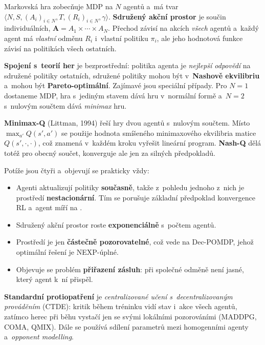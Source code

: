 \documentclass[11pt,a4paper]{article}
\theoremstyle{definition}
\begin{document}
\begin{defbox}
Markovská hra zobecňuje MDP na $N$ agentů a~má tvar
$\langle N, S, (A_i)_{i\in N}, T, (R_i)_{i \in N}, \gamma\rangle$.
\textbf{Sdružený akční prostor} je součin individuálních,
$\mathbf{A} = A_1 \times \cdots \times A_N$. Přechod závisí na akcích \emph{všech} agentů
a~každý agent má \emph{vlastní} odměnu $R_i$ i~vlastní politiku $\pi_i$, ale jeho hodnotová
funkce závisí na politikách všech ostatních.

\textbf{Spojení s~teorií her} je bezprostřední: politika agenta je \emph{nejlepší odpovědí} na
sdružené politiky ostatních, sdružené politiky mohou být v~\textbf{Nashově ekvilibriu} a~mohou
být \textbf{Pareto-optimální}. Zajímavé jsou speciální případy. Pro $N=1$ dostaneme MDP, hra
s~jediným stavem dává hru v~normální formě a~$N=2$ s~nulovým součtem dává \emph{minimax} hru.

\textbf{Minimax-Q} (Littman, 1994) řeší hry dvou agentů s~nulovým součtem. Místo
$\max_{a'} Q(s',a')$ se použije hodnota smíšeného minimaxového ekvilibria matice
$Q(s',\cdot,\cdot)$, což znamená v~každém kroku vyřešit lineární program. \textbf{Nash-Q} dělá
totéž pro obecný součet, konverguje ale jen za silných předpokladů.
\end{defbox}

\begin{defbox}
Potíže jsou čtyři a~objevují se prakticky vždy:
\begin{itemize}
\item Agenti aktualizují politiky \textbf{současně}, takže z~pohledu jednoho z~nich je
  prostředí \textbf{nestacionární}. Tím se porušuje základní předpoklad konvergence RL a~agent
  míří na .
\item Sdružený akční prostor roste \textbf{exponenciálně} s~počtem agentů.
\item Prostředí je jen \textbf{částečně pozorovatelné}, což vede na Dec-POMDP, jehož optimální
  řešení je NEXP-úplné.
\item Objevuje se problém \textbf{přiřazení zásluh}: při společné odměně není jasné, který
  agent k~ní přispěl.
\end{itemize}
\textbf{Standardní protiopatření} je \emph{centralizované učení s~decentralizovaným prováděním}
(CTDE): kritik během tréninku vidí stav i~akce všech agentů, zatímco herec při běhu vystačí
jen se svými lokálními pozorováními (MADDPG, COMA, QMIX). Dále se používá sdílení parametrů
mezi homogenními agenty a~\emph{opponent modelling}.
\end{defbox}
\end{document}
